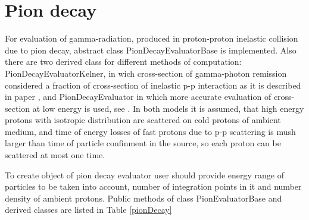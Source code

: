 \section{Pion decay}

For evaluation of gamma-radiation, produced in proton-proton inelastic collision due to pion decay, abstract class PionDecayEvaluatorBase is implemented. Also there are two derived class for different methods of computation: PionDecayEvaluatorKelner, in wich cross-section of gamma-photon remission considered a fraction of cross-section of inelastic p-p interaction as it is described in paper \cite{Kelner}, and PionDecayEvaluator in which more accurate evaluation of cross-section at low energy is used, see \cite{Kafexhiu}. In both models it is assumed, that high energy protons with isotropic distribution are scattered on cold protons of ambient medium, and time of energy losses of fast protons due to p-p scattering is mush larger than time of particle confinment in the source, so each proton can be scattered at most one time.

To create object of pion decay evaluator user should provide energy range of particles to be taken into account, number of integration points in it and number density of ambient protons. Public methods of class PionEvaluatorBase and derived classes are listed in Table \ref{pionDecay}

